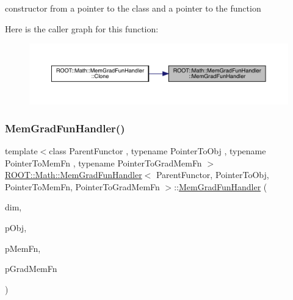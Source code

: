 constructor from a pointer to the class and a pointer to the function 

Here is the caller graph for this function\+:\nopagebreak
\begin{figure}[H]
\begin{center}
\leavevmode
\includegraphics[width=350pt]{dc/dbd/classROOT_1_1Math_1_1MemGradFunHandler_afb840379796fb7d05d885bc3152a3175_icgraph}
\end{center}
\end{figure}
\mbox{\label{classROOT_1_1Math_1_1MemGradFunHandler_a1e421d0a42589a826fd0b9f7f1a475ec}} 
\subsubsection{\texorpdfstring{MemGradFunHandler()}{MemGradFunHandler()}\hspace{0.1cm}{\footnotesize\ttfamily [2/6]}}
{\footnotesize\ttfamily template$<$class Parent\+Functor , typename Pointer\+To\+Obj , typename Pointer\+To\+Mem\+Fn , typename Pointer\+To\+Grad\+Mem\+Fn $>$ \\
\mbox{\hyperlink{classROOT_1_1Math_1_1MemGradFunHandler}{R\+O\+O\+T\+::\+Math\+::\+Mem\+Grad\+Fun\+Handler}}$<$ Parent\+Functor, Pointer\+To\+Obj, Pointer\+To\+Mem\+Fn, Pointer\+To\+Grad\+Mem\+Fn $>$\+::\mbox{\hyperlink{classROOT_1_1Math_1_1MemGradFunHandler}{Mem\+Grad\+Fun\+Handler}} (\begin{DoxyParamCaption}\item[{unsigned int}]{dim,  }\item[{const Pointer\+To\+Obj \&}]{p\+Obj,  }\item[{Pointer\+To\+Mem\+Fn}]{p\+Mem\+Fn,  }\item[{Pointer\+To\+Grad\+Mem\+Fn}]{p\+Grad\+Mem\+Fn }\end{DoxyParamCaption})\hspace{0.3cm}{\ttfamily [inline]}}



